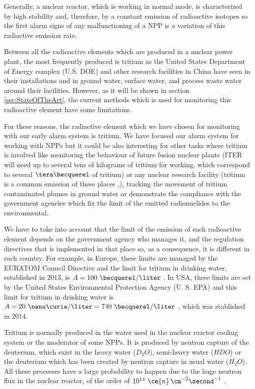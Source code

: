 Generally, a nuclear reactor, which is working in normal mode, is characterized by high stability and, therefore, by a constant emission of radioactive isotopes so the first alarm signs of any malfunctioning of a NPP is a variation of this radiactive emission rate.

Between all the radioactive elements which are produced in a nuclear power plant, the most frequently produced is tritium as the United States Department of Energy complex (U.S. DOE) \cite{FiberDetector1a} \cite{FiberDetector1b}  and other research facilities in China \cite{CommonEmissionTritium} have seen in their installations and in ground water, surface water, and process waste water around their facilities. However, as it will be shown in section \ref{sec:StateOfTheArt}, the current methods which is used for monitoring this radioactive element have some limitations. 

For these reasons, the radiactive element which we have chosen for monitoring with our early alarm system is tritium. We have focused our alarm system for working with NPPs but it could be also interesting for other tasks where tritium is involved like monitoring the behaviour of future fusion nuclear plants (ITER will need up to several tens of kilograms of tritium for working, which correspond to several $\tera\becquerel$ of tritium) or any nuclear research facility (tritium is a commun emission of these places \cite{FERMILAB},\cite{BrookHavenNationalLaboratory}),  tracking the movement of tritium contaminated plumes in ground water \cite{TrackingTritium} or demonstrate the compliance with the government agencies which fix the limit of the emitted radionuclides to the environmental. 

We have to take into account that the limit of the emission of each radioactive element depends on the government agency who manages it, and the regulation directives that is implemented in that place so, as a consequence, it is different in each country. For example, in Europe, these limits are managed by the EURATOM Council Directive and the limit for tritium in drinking water, established in $2013$, is $A = 100~\becquerel/\liter$ \cite{100BqL}. In USA, these limits are set by the United States Environmental Protection Agency (U. S. EPA) and this limit for tritium in drinking water is $A = 20~\nano\curie/\liter = 740~\becquerel/\liter$ \cite{740BqL}, which was stablished in $2014$.

Tritium is normally produced in the water used in the nuclear reactor cooling system or the moderator of some NPPs. It is produced by neutron capture of the deuterium, which exist in the heavy water ($D_2 O$), semi-heavy water ($H D O$) or the deuterium which has been created by neutron capture in usual water ($H_2 O$). All these processes have a large probability to happen due to the huge neutron flux in the nuclear reactor, of the order of $10^{14} ~\ce{n} \, \cm^{-2} \second^{-1}$ \cite{CrossSeccionNeutrons}. 

